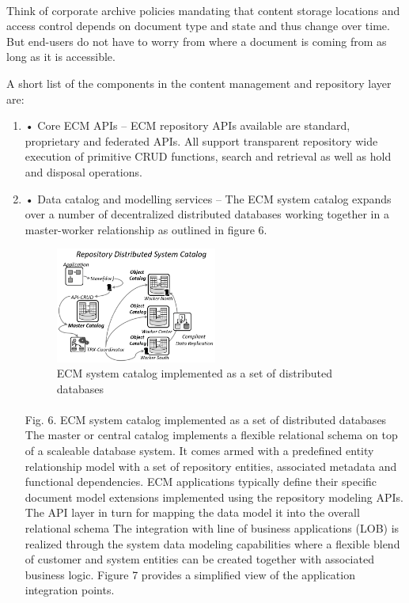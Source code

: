 \documentclass[EPiC]{easychair} %
\begin{document}
\paragraph{} Think of corporate archive policies mandating that content storage locations and access control depends on document type and state and thus change over time. But end-users do not have to worry from where a document is coming from as long as it is accessible.

A short list of the components in the content management and repository layer are:

\begin{enumerate}
    \item •	Core ECM APIs – ECM repository APIs available are standard, proprietary and federated APIs. All support transparent repository wide execution of primitive CRUD functions, search and retrieval as well as hold and disposal operations.
    \item •	Data catalog and modelling services – The ECM system catalog expands over a number of decentralized distributed databases working together in a master-worker relationship as outlined in figure 6.

\begin{figure}[hbt!]
	\begin{centering}
	\includegraphics[width=0.5\textwidth]{pics/ECMpic06}
	\caption{ECM system catalog implemented as a set of distributed databases}
	\label{fig:ecm-catalog}
	\end{centering}
\end{figure}

\paragraph{} Fig. 6. ECM system catalog implemented as a set of distributed databases
The master or central catalog implements a flexible relational schema on top of a scaleable database system. It comes armed with a predefined entity relationship model with a set of repository entities, associated metadata and functional dependencies.  ECM applications typically define their specific document model extensions implemented using the repository modeling APIs. The API layer in turn for mapping the data model it into the overall relational schema The integration with line of business applications (LOB) is realized through the system data modeling capabilities where a flexible blend of customer and system entities can be created together with associated business logic. Figure 7 provides a simplified view of the application integration points.


\end{enumerate}
\end{document}
